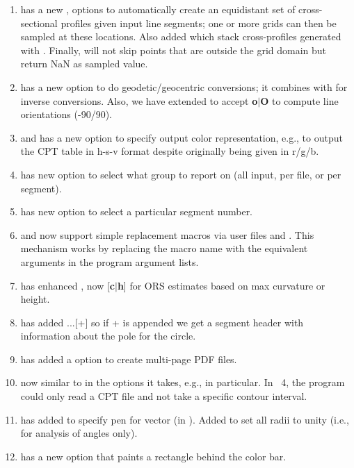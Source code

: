 \begin{enumerate}
	\item {} has a new ,  options to automatically create an equidistant set of cross-sectional
		profiles given input line segments; one or more grids can then be sampled at these locations.  Also added 
		which stack cross-profiles generated with .  Finally, 
		will not skip points that are outside the grid domain but return NaN as sampled value.
	\item {} has a new  option to do geodetic/geocentric conversions; it combines with 
		for inverse conversions.  Also, we have extended  to accept \textbf{o}$|$\textbf{O} to compute line orientations (-90/90).
	\item {} and  has a new  option to specify output color representation, e.g.,
		to output the CPT table in h-s-v format despite originally being given in r/g/b.
	\item {} has new option  to select what group to report on (all input, per file, or per segment).
	\item {} has new option  to select a particular segment number.
	\item {} and  now support simple replacement macros via user files
		 and .  This mechanism works by replacing the macro name
		with the equivalent arguments in the program argument lists.
	\item {} has enhanced , now [\textbf{c}$|$\textbf{h}] for ORS estimates based on max curvature or height.
	\item {} has added ...[+] so if + is appended we get a segment header with information about the pole for the circle.
	\item {} has added a  option to create multi-page PDF files.
	\item {} now similar to  in the options it takes, e.g.,  in particular.
		In \GMT\ 4, the program could only read a CPT file and not take a specific contour interval.
	\item {} has added  to specify pen for vector (in ).
		Added  to set all radii to unity (i.e., for analysis of angles only).
	\item {} has a new option  that paints a rectangle behind the color bar.

\end{enumerate}
